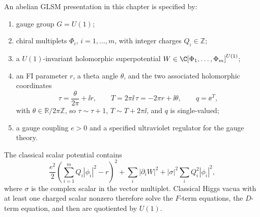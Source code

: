 \begin{definition}[Abelian \(2D\) \(\mathcal N=(2,2)\) GLSM presentation]
\label{def:abelian-2d-glsm-presentation}
An abelian GLSM presentation in this chapter is specified by:
\begin{enumerate}
\item gauge group \(G=U(1)\);
\item chiral multiplets \(\Phi_i\), \(i=1,\ldots,m\), with integer charges
  \(Q_i\in\mathbb Z\);
\item a \(U(1)\)-invariant holomorphic superpotential
  \(W\in\C[\Phi_1,\ldots,\Phi_m]^{U(1)}\);
\item an FI parameter \(r\), a theta angle \(\theta\), and the two associated
  holomorphic coordinates
\[
  \tau=\frac{\theta}{2\pi}+\ii r,
  \qquad
  T=2\pi\ii\,\tau=-2\pi r+\ii\theta,
  \qquad
  q=\ee^T ,
\]
  with \(\theta\in\mathbb R/2\pi\mathbb Z\), so
  \(\tau\sim\tau+1\), \(T\sim T+2\pi\ii\), and \(q\) is single-valued;
\item a gauge coupling \(e>0\) and a specified ultraviolet regulator for the
  gauge theory.
\end{enumerate}
The classical scalar potential contains
\begin{equation}
  \frac{e^2}{2}\left(\sum_{i=1}^m Q_i|\phi_i|^2-r\right)^2
  +\sum_i|\partial_iW|^2
  +|\sigma|^2\sum_i Q_i^2|\phi_i|^2 ,
  \label{eq:abelian-glsm-classical-potential}
\end{equation}
where \(\sigma\) is the complex scalar in the vector multiplet.  Classical
Higgs vacua with at least one charged scalar nonzero therefore solve the
\(F\)-term equations, the \(D\)-term equation, and then are quotiented by
\(U(1)\).
\end{definition}

